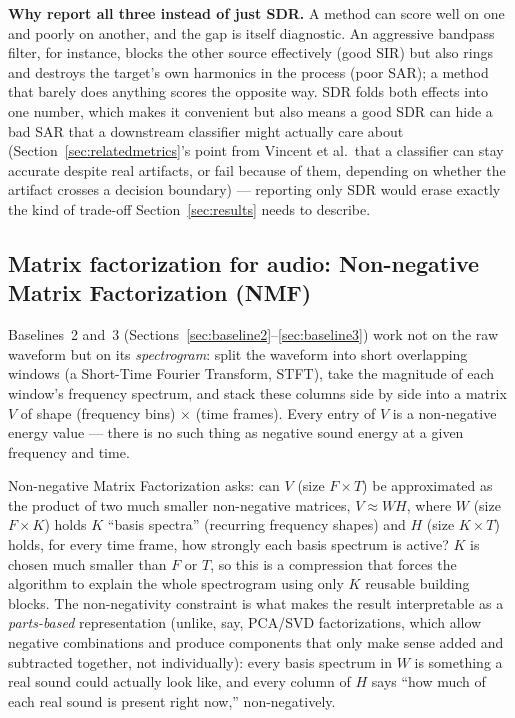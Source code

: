 \documentclass[11pt]{article}
\begin{document}
\textbf{Why report all three instead of just SDR.} A method can score well
on one and poorly on another, and the gap is itself diagnostic. An
aggressive bandpass filter, for instance, blocks the other source
effectively (good SIR) but also rings and destroys the target's own
harmonics in the process (poor SAR); a method that barely does anything
scores the opposite way. SDR folds both effects into one number, which
makes it convenient but also means a good SDR can hide a bad SAR that a
downstream classifier might actually care about (Section~\ref{sec:relatedmetrics}'s
point from Vincent et al.\ that a classifier can stay accurate despite real
artifacts, or fail because of them, depending on whether the artifact
crosses a decision boundary) --- reporting only SDR would erase exactly the
kind of trade-off Section~\ref{sec:results} needs to describe.

\subsection{Matrix factorization for audio: Non-negative Matrix Factorization (NMF)}
\label{sec:bg-nmf}

Baselines~2 and~3 (Sections~\ref{sec:baseline2}--\ref{sec:baseline3}) work
not on the raw waveform but on its \emph{spectrogram}: split the waveform
into short overlapping windows (a Short-Time Fourier Transform, STFT), take
the magnitude of each window's frequency spectrum, and stack these columns
side by side into a matrix $V$ of shape (frequency bins) $\times$ (time
frames). Every entry of $V$ is a non-negative energy value --- there is no
such thing as negative sound energy at a given frequency and time.

Non-negative Matrix Factorization asks: can $V$ (size $F\times T$) be
approximated as the product of two much smaller non-negative matrices,
$V \approx WH$, where $W$ (size $F\times K$) holds $K$ ``basis spectra''
(recurring frequency shapes) and $H$ (size $K\times T$) holds, for every
time frame, how strongly each basis spectrum is active? $K$ is chosen much
smaller than $F$ or $T$, so this is a compression that forces the
algorithm to explain the whole spectrogram using only $K$ reusable
building blocks. The non-negativity constraint is what makes the result
interpretable as a \emph{parts-based} representation (unlike, say, PCA/SVD
factorizations, which allow negative combinations and produce components
that only make sense added and subtracted together, not individually):
every basis spectrum in $W$ is something a real sound could actually look
like, and every column of $H$ says ``how much of each real sound is
present right now,'' non-negatively.
\end{document}
